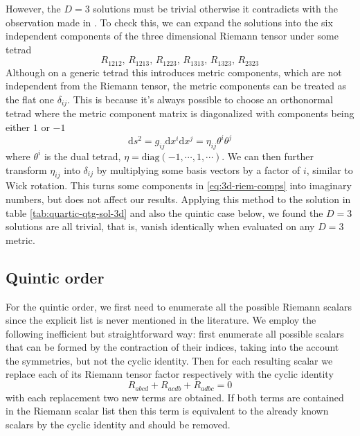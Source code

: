 \documentclass[a4paper,11pt]{article}
\newcommand{\dd}{{\mathrm d}}
\begin{document}
However, the $D = 3$ solutions must be trivial otherwise it contradicts with the observation made in \cite{aspects-of-3d-higher-grav}. To check this, we can expand the solutions into the six independent components of the three dimensional Riemann tensor under some tetrad
\begin{equation}\label{eq:3d-riem-comps}
    R_{1212}, \, R_{1213}, \, R_{1223}, \, R_{1313}, \, R_{1323}, \, R_{2323}
\end{equation}
Although on a generic tetrad this introduces metric components, which are not independent from the Riemann tensor, the metric components can be treated as the flat one $\delta_{ij}$. This is because it's always possible to choose an orthonormal tetrad where the metric component matrix is diagonalized with components being either $1$ or $-1$
\begin{equation}
    \dd s^2 = g_{ij} \dd x^i \dd x^j = \eta_{ij} \theta^i \theta^j
\end{equation}
where $\theta^i$ is the dual tetrad, $\eta = \mathrm{diag}(-1, \cdots, 1, \cdots)$. We can then further transform $\eta_{ij}$ into $\delta_{ij}$ by multiplying some basis vectors by a factor of $i$, similar to Wick rotation. This turns some components in \eqref{eq:3d-riem-comps} into imaginary numbers, but does not affect our results. Applying this method to the solution in table \ref{tab:quartic-qtg-sol-3d} and also the quintic case below, we found the $D = 3$ solutions are all trivial, that is, vanish identically when evaluated on any $D = 3$ metric.

\subsection{Quintic order}
For the quintic order, we first need to enumerate all the possible Riemann scalars since the explicit list is never mentioned in the literature. We employ the following inefficient but straightforward way: first enumerate all possible scalars that can be formed by the contraction of their indices, taking into the account the symmetries, but not the cyclic identity. Then for each resulting scalar we replace each of its Riemann tensor factor respectively with the cyclic identity
\begin{equation}
    R_{abcd} + R_{acdb} + R_{adbc} = 0
\end{equation}
with each replacement two new terms are obtained. If both terms are contained in the Riemann scalar list then this term is equivalent to the already known scalars by the cyclic identity and should be removed.
\end{document}
